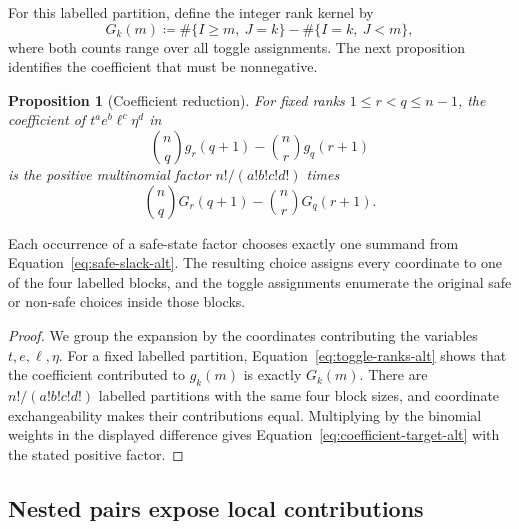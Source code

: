 \documentclass[11pt]{article}
\newtheorem{proposition}[theorem]{Proposition}
\begin{document}
For this labelled partition, define the integer rank kernel by
\begin{equation}
G_k(m)
\coloneqq
\#\{I\geq m,\ J=k\}
-
\#\{I=k,\ J<m\},
\label{eq:integer-kernel-alt}
\end{equation}
where both counts range over all toggle assignments.
The next proposition identifies the coefficient that must be nonnegative.

\begin{proposition}[Coefficient reduction]\label{prop:coefficient-reduction}
For fixed ranks ${1\leq r<q\leq n-1}$, the coefficient of $t^ae^b\ell^c\eta^d$ in
\begin{equation*}
\binom nq g_r(q+1)-\binom nr g_q(r+1)
\end{equation*}
is the positive multinomial factor $n!/(a!b!c!d!)$ times
\begin{equation}
\binom nqG_r(q+1)-\binom nrG_q(r+1).
\label{eq:coefficient-target-alt}
\end{equation}
\end{proposition}

Each occurrence of a safe-state factor chooses exactly one summand from Equation~\eqref{eq:safe-slack-alt}.
The resulting choice assigns every coordinate to one of the four labelled blocks, and the toggle assignments enumerate the original safe or non-safe choices inside those blocks.

\begin{proof}
We group the expansion by the coordinates contributing the variables $t,e,\ell,\eta$.
For a fixed labelled partition, Equation~\eqref{eq:toggle-ranks-alt} shows that the coefficient contributed to $g_k(m)$ is exactly $G_k(m)$.
There are $n!/(a!b!c!d!)$ labelled partitions with the same four block sizes, and coordinate exchangeability makes their contributions equal.
Multiplying by the binomial weights in the displayed difference gives Equation~\eqref{eq:coefficient-target-alt} with the stated positive factor.
\end{proof}

    \subsection{Nested pairs expose local contributions}\label{subsec:nested-pairs}
\end{document}
